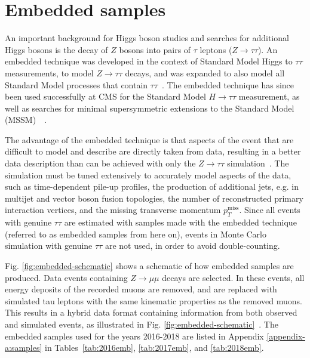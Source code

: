 \section{Embedded samples}
\label{section:embedded-samples}
An important background for Higgs boson studies and searches for additional Higgs bosons is the decay of $Z$ bosons into pairs of $\tau$ leptons ($Z \rightarrow \tau\tau$). An embedded technique was developed in the context of Standard Model Higgs to $\tau\tau$ measurements, to model $Z \rightarrow \tau\tau$ decays, and was expanded to also model all Standard Model processes that contain $\tau\tau$~\cite{CMS-TAU-18-001}. The embedded technique has since been used successfully at CMS for the Standard Model $H \rightarrow \tau\tau$ measurement, as well as searches for minimal supersymmetric extensions to the Standard Model (MSSM)~\cite{CMS-HIG-13-021}~\cite{CMS-HIG-19-010}. 

The advantage of the embedded technique is that aspects of the event that are difficult to model and describe are directly taken from data, resulting in a better data description than can be achieved with only the $Z \rightarrow \tau\tau$ simulation~\cite{CMS-TAU-18-001}. The simulation must be tuned extensively to accurately model aspects of the data, such as time-dependent pile-up profiles, the production of additional jets, e.g. in multijet and vector boson fusion topologies, the number of reconstructed primary interaction vertices, and the missing transverse momentum $p_{T}^{\text{miss}}$. Since all events with genuine $\tau\tau$ are estimated with samples made with the embedded technique (referred to as embedded samples from here on), events in Monte Carlo simulation with genuine $\tau\tau$ are not used, in order to avoid double-counting.

Fig. \ref{fig:embedded-schematic} shows a schematic of how embedded samples are produced. Data events containing $Z \rightarrow \mu\mu$ decays are selected. In these events, all energy deposits of the recorded muons are removed, and are replaced with simulated tau leptons with the same kinematic properties as the removed muons. This results in a hybrid data format containing information from both observed and simulated events, as illustrated in Fig. \ref{fig:embedded-schematic}~\cite{CMS-TAU-18-001}. The embedded samples used for the years 2016-2018 are listed in Appendix \ref{appendix-a:samples} in Tables~\ref{tab:2016emb}, \ref{tab:2017emb}, and \ref{tab:2018emb}.

